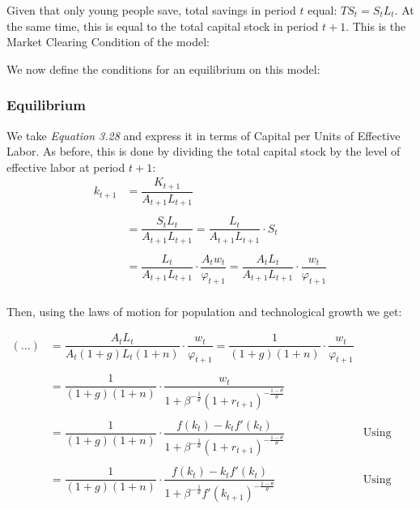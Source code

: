 Given that only young people save, total savings in period $t$ equal: $TS_t=S_tL_t$. At the same time, this is equal to the total capital stock in period $t+1$. This is the Market Clearing Condition of the model: 

\bigskip
We now define the conditions for an equilibrium on this model:


\subsubsection{Equilibrium}

We take \textit{Equation 3.28} and express it in terms of Capital per Units of Effective Labor. As before, this is done by dividing the total capital stock by the level of effective labor at period $t+1$:
\begin{align*}
k_{t+1} &= \dfrac{K_{t+1}}{A_{t+1}L_{t+1}} \\
\\
&= \dfrac{S_tL_t}{A_{t+1}L_{t+1}} = \dfrac{L_t}{A_{t+1}L_{t+1}}\cdot S_t \\
\\
&= \dfrac{L_t}{A_{t+1}L_{t+1}}\cdot \dfrac{A_tw_t}{\varphi_{t+1}} = \dfrac{A_tL_t}{A_{t+1}L_{t+1}}\cdot \dfrac{w_t}{\varphi_{t+1}} \\
\end{align*}

Then, using the laws of motion for population and technological growth we get:

\begin{align*}
(...) &= \dfrac{A_tL_t}{A_{t}(1+g)L_{t}(1+n)}\cdot \dfrac{w_t}{\varphi_{t+1}} = \dfrac{1}{(1+g)(1+n)} \cdot \dfrac{w_t}{\varphi_{t+1}}\\
\\
&= \dfrac{1}{(1+g)(1+n)}\cdot \dfrac{w_t}{1+\beta^{-\frac{1}{\theta}}(1+r_{t+1})^{-\frac{1-\theta}{\theta}}} \\
\\
&= \dfrac{1}{(1+g)(1+n)} \cdot \dfrac{f(k_t)-k_tf'(k_t)}{1+\beta^{-\frac{1}{\theta}}(1+r_{t+1})^{-\frac{1-\theta}{\theta}}} & \text{Using (3.12)} \\
\\
&= \dfrac{1}{(1+g)(1+n)} \cdot \dfrac{f(k_t)-k_tf'(k_t)}{1+\beta^{-\frac{1}{\theta}}f'(k_{t+1})^{-\frac{1-\theta}{\theta}}} & \text{Using 3.11}
\end{align*}

